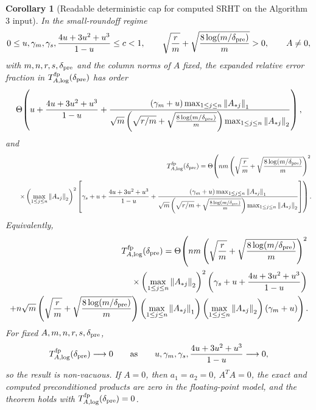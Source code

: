 \documentclass[11pt]{article}
\newcommand{\Norm}[1]{\left\lVert #1\right\rVert_2}
\newcommand{\NormOne}[1]{\left\lVert #1\right\rVert_1}
\newtheorem{corollary}[theorem]{Corollary}
\theoremstyle{remark}
\begin{document}
\begin{corollary}[Readable deterministic cap for computed SRHT on the Algorithm 3 input]
In the small-roundoff regime
\[
  0\le u,\gamma_m,\gamma_s,\frac{4u+3u^2+u^3}{1-u}\le c<1,
  \qquad
  \sqrt{\frac rm}+\sqrt{\frac{8\log(m/\delta_{\rm pre})}{m}}>0,
  \qquad
  A\ne0,
\]
with \(m,n,r,s,\delta_{\rm pre}\) and the column norms of \(A\) fixed, the
expanded relative error fraction in
\(T_{A,\log}^{\rm fp}(\delta_{\rm pre})\) has order
\[
  \Theta\!\left(
    u+\frac{4u+3u^2+u^3}{1-u}
    +
    \frac{
      (\gamma_m+u)\max_{1\le j\le n}\NormOne{A_{*j}}
    }{
      \sqrt m
      \left(
        \sqrt{r/m}+\sqrt{\frac{8\log(m/\delta_{\rm pre})}{m}}
      \right)
      \max_{1\le j\le n}\Norm{A_{*j}}
    }
  \right),
\]
and
\begingroup
\small
\[
\begin{aligned}
  T_{A,\log}^{\rm fp}(\delta_{\rm pre})
  =
  \Theta\!\left(
    nm
    \left(
      \sqrt{\frac rm}
      +
      \sqrt{\frac{8\log(m/\delta_{\rm pre})}{m}}
    \right)^2
    \right.
  \\
  \left.
    \qquad\times
    \left(\max_{1\le j\le n}\Norm{A_{*j}}\right)^2
    \left[
      \gamma_s+u+\frac{4u+3u^2+u^3}{1-u}
      +
      \frac{
        (\gamma_m+u)\max_{1\le j\le n}\NormOne{A_{*j}}
      }{
        \sqrt m
        \left(
          \sqrt{r/m}+\sqrt{\frac{8\log(m/\delta_{\rm pre})}{m}}
        \right)
        \max_{1\le j\le n}\Norm{A_{*j}}
      }
    \right]
  \right).
\end{aligned}
\]
\endgroup
Equivalently,
\begingroup
\small
\[
\begin{aligned}
  T_{A,\log}^{\rm fp}(\delta_{\rm pre})
  =
  \Theta\!\left(
    nm
    \left(
      \sqrt{\frac rm}
      +
      \sqrt{\frac{8\log(m/\delta_{\rm pre})}{m}}
    \right)^2
    \right.
  \\
  \left.
    \qquad\times
    \left(\max_{1\le j\le n}\Norm{A_{*j}}\right)^2
    \left(\gamma_s+u+\frac{4u+3u^2+u^3}{1-u}\right)
  \right.
  \\
  \left.
    +
    n\sqrt m
    \left(
      \sqrt{\frac rm}
      +
      \sqrt{\frac{8\log(m/\delta_{\rm pre})}{m}}
    \right)
    \left(\max_{1\le j\le n}\NormOne{A_{*j}}\right)
    \left(\max_{1\le j\le n}\Norm{A_{*j}}\right)
    (\gamma_m+u)
  \right).
\end{aligned}
\]
\endgroup
For fixed \(A,m,n,r,s,\delta_{\rm pre}\),
\[
  T_{A,\log}^{\rm fp}(\delta_{\rm pre})\longrightarrow0
  \qquad
  \text{as}\qquad
  u,\gamma_m,\gamma_s,\frac{4u+3u^2+u^3}{1-u}\longrightarrow0,
\]
so the result is non-vacuous.  If \(A=0\), then \(a_1=a_2=0\),
\(A^TA=0\), the exact and computed preconditioned products are zero in the
floating-point model, and the theorem holds with
\(T_{A,\log}^{\rm fp}(\delta_{\rm pre})=0\).
\end{corollary}
\end{document}
